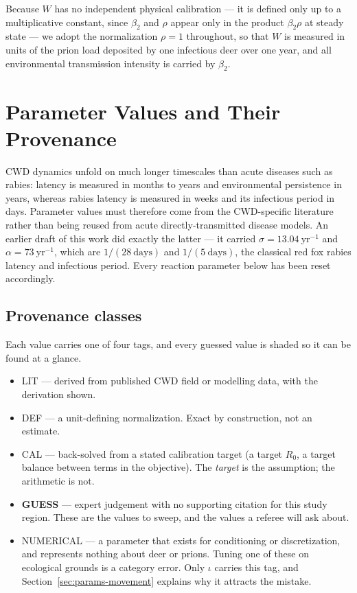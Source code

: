 \documentclass[11pt]{article}
\newcommand{\tagLIT}{{\footnotesize\textsf{\textcolor{green!40!black}{LIT}}}}
\newcommand{\tagDEF}{{\footnotesize\textsf{\textcolor{blue!60!black}{DEF}}}}
\newcommand{\tagCAL}{{\footnotesize\textsf{\textcolor{orange!75!black}{CAL}}}}
\newcommand{\tagGUESS}{{\footnotesize\textsf{\textbf{\textcolor{red!70!black}{GUESS}}}}}
\newcommand{\tagNUM}{{\footnotesize\textsf{\textcolor{purple!70!black}{NUMERICAL}}}}
\begin{document}
Because $W$ has no independent physical calibration --- it is defined only up to a multiplicative constant, since $\beta_2$ and $\rho$ appear only in the product $\beta_2\rho$ at steady state --- we adopt the normalization $\rho = 1$ throughout, so that $W$ is measured in units of the prion load deposited by one infectious deer over one year, and all environmental transmission intensity is carried by $\beta_2$.

\section{Parameter Values and Their Provenance}
\label{sec:params}

CWD dynamics unfold on much longer timescales than acute diseases such as rabies: latency is measured in months to years and environmental persistence in years, whereas rabies latency is measured in weeks and its infectious period in days. Parameter values must therefore come from the CWD-specific literature rather than being reused from acute directly-transmitted disease models. An earlier draft of this work did exactly the latter --- it carried $\sigma = 13.04\ \mathrm{yr}^{-1}$ and $\alpha = 73\ \mathrm{yr}^{-1}$, which are $1/(28\ \text{days})$ and $1/(5\ \text{days})$, the classical red fox rabies latency and infectious period. Every reaction parameter below has been reset accordingly.

\subsection{Provenance classes}

Each value carries one of four tags, and every guessed value is shaded so it can be found at a glance.
\begin{itemize}
\item \tagLIT{} --- derived from published CWD field or modelling data, with the derivation shown.
\item \tagDEF{} --- a unit-defining normalization. Exact by construction, not an estimate.
\item \tagCAL{} --- back-solved from a stated calibration target (a target $R_0$, a target balance between terms in the objective). The \emph{target} is the assumption; the arithmetic is not.
\item \tagGUESS{} --- expert judgement with no supporting citation for this study region. These are the values to sweep, and the values a referee will ask about.
\item \tagNUM{} --- a parameter that exists for conditioning or discretization, and represents nothing about deer or prions. Tuning one of these on ecological grounds is a category error. Only $\iota$ carries this tag, and Section~\ref{sec:params-movement} explains why it attracts the mistake.
\end{itemize}
\end{document}
